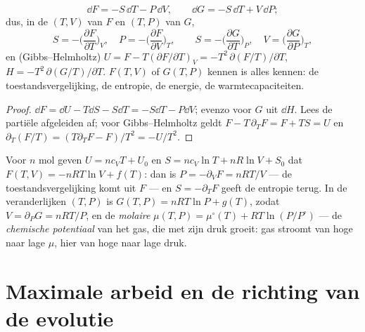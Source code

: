 \begin{theorem}\label{thm:b2:thermodynamic-potentials:dFdG}
\[
\dd F = -S\,\dd T - P\,\dd V, \qquad
\dd G = -S\,\dd T + V\,\dd P ;
\]
dus, in de  $(T,V)$ van $F$ en $(T,P)$ van $G$,
\[
S = -\Big(\frac{\partial F}{\partial T}\Big)_V, \quad
P = -\Big(\frac{\partial F}{\partial V}\Big)_T, \qquad
S = -\Big(\frac{\partial G}{\partial T}\Big)_P, \quad
V = \Big(\frac{\partial G}{\partial P}\Big)_T ,
\]
en (Gibbs--Helmholtz)
$U = F - T(\partial F/\partial T)_V =
-T^2\,\partial(F/T)/\partial T$,
$H = -T^2\,\partial(G/T)/\partial T$.
$F(T,V)$ of $G(T,P)$ kennen is alles kennen: de toestandsvergelijking,
de entropie, de energie, de warmtecapaciteiten.
\end{theorem}

\begin{proof}
$\dd F = \dd U - T\dd S - S\dd T = -S\dd T - P\dd V$; evenzo voor $G$
uit $\dd H$. Lees de partiële afgeleiden af; voor Gibbs--Helmholtz geldt
$F - T\,\partial_TF = F + TS = U$ en
$\partial_T(F/T) = (T\partial_TF -
F)/T^2 = -U/T^2$.
\end{proof}

\begin{example}\label{ex:b2:thermodynamic-potentials:perfect}
Voor $n$ mol geven $U = nc_{V}T + U_0$ en $S = nc_V\ln T + nR\ln V + S_0$
dat $F(T,V) = -nRT\ln V + f(T)$: dan is $P = -\partial_VF = nRT/V$
--- de toestandsvergelijking komt uit $F$ --- en $S = -\partial_TF$
geeft de entropie terug. In de veranderlijken $(T,P)$ is
$G(T,P) = nRT\ln P +
g(T)$, zodat $V = \partial_PG = nRT/P$, en de
\emph{molaire} 
$\mu(T,P) = \mu^\circ(T) + RT\ln(P/P^\circ)$ --- de \emph{chemische
potentiaal} van het gas, die met zijn
druk groeit: gas stroomt van hoge naar lage $\mu$, hier van hoge naar lage
druk.
\end{example}

\section{Maximale arbeid en de richting van de evolutie}

